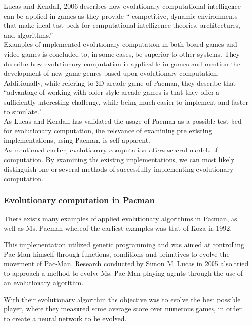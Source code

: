 Lucas and Kendall, 2006 \cite{Lucas2006} describes how evolutionary computational intelligence can be applied in games as they provide  \enquote{ competitive, dynamic
environments that make ideal test beds
for computational intelligence theories,
architectures, and algorithms.}\cite[pp. 10]{Lucas2006}\\
Examples of implemented evolutionary computation in both board games and video games is concluded to, in some cases, be superior to other systems. They describe how evolutionary computation is applicable in games and mention the development of new game genres based upon evolutionary computation. Additionally, while refering to 2D arcade game of Pacman, they describe that \enquote{advantage
of working with older-style arcade games is that they
offer a sufficiently interesting challenge, while being much
easier to implement and faster to simulate.} \cite[pp 15]{Lucas2006} \\

As Lucas and Kendall has validated the usage of Pacman as a possible test bed for evolutionary computation, the relevance of examining pre existing implementations, using Pacman, is self apparent.\\
As mentioned earlier, evolutionary computation offers several models of computation. By examining the existing implementations, we can most likely distinguish one or several methods of successfully implementing evolutionary computation.

\subsubsection{Evolutionary computation in Pacman}


There exists many examples of applied evolutionary algorithms in Pacman, as well as Ms. Pacman whereof the earliest examples was that of Koza in 1992.\cite{Koza1992}

This implementation utilized genetic programming and was aimed at controlling Pac-Man himself through functions, conditions and primitives to evolve the movement of Pac-Man. \cite[pp. 2]{Lucas2005}
Research conducted by Simon M. Lucas in 2005 also tried to approach a method to evolve Ms. Pac-Man playing agents through the use of an evolutionary algorithm. \cite{Lucas2005}

With their evolutionary algorithm the objective was to evolve the best possible player, where they measured some average score over numerous games, in order to create a neural network to be evolved. \cite[pp. 8]{Lucas2005}

